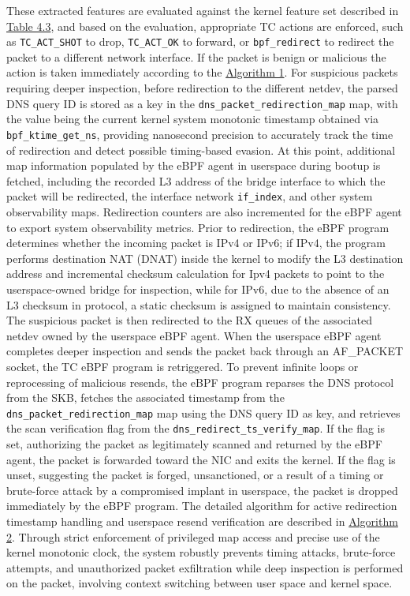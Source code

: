 \documentclass [11pt, proquest] {uwthesis}[2020/02/24]
\begin{document}
These extracted features are evaluated against the kernel feature set described in \hyperref[sec:feature-kernel]{Table 4.3}, and based on the evaluation, appropriate TC actions are enforced, such as \texttt{TC\_ACT\_SHOT} to drop, \texttt{TC\_ACT\_OK} to forward, or \texttt{bpf\_redirect} to redirect the packet to a different network interface. If the packet is benign or malicious the action is taken immediately according to the \hyperref[sec:alg1]{Algorithm 1}. For suspicious packets requiring deeper inspection, before redirection to the different netdev, the parsed DNS query ID is stored as a key in the \texttt{dns\_packet\_redirection\_map} map, with the value being the current kernel system monotonic timestamp obtained via \texttt{bpf\_ktime\_get\_ns}, providing nanosecond precision to accurately track the time of redirection and detect possible timing-based evasion. At this point, additional map information populated by the eBPF agent in userspace during bootup is fetched, including the recorded L3 address of the bridge interface to which the packet will be redirected, the interface network \texttt{if\_index}, and other system observability maps. Redirection counters are also incremented for the eBPF agent to export system observability metrics. Prior to redirection, the eBPF program determines whether the incoming packet is IPv4 or IPv6; if IPv4, the program performs destination NAT (DNAT) inside the kernel to modify the L3 destination address and incremental checksum calculation for Ipv4 packets to point to the userspace-owned bridge for inspection, while for IPv6, due to the absence of an L3 checksum in protocol, a static checksum is assigned to maintain consistency. The suspicious packet is then redirected to the RX queues of the associated netdev owned by the userspace eBPF agent. When the userspace eBPF agent completes deeper inspection and sends the packet back through an AF\_PACKET socket, the TC eBPF program is retriggered. To prevent infinite loops or reprocessing of malicious resends, the eBPF program reparses the DNS protocol from the SKB, fetches the associated timestamp from the \texttt{dns\_packet\_redirection\_map} map using the DNS query ID as key, and retrieves the scan verification flag from the \texttt{dns\_redirect\_ts\_verify\_map}. If the flag is set, authorizing the packet as legitimately scanned and returned by the eBPF agent, the packet is forwarded toward the NIC and exits the kernel. If the flag is unset, suggesting the packet is forged, unsanctioned, or a result of a timing or brute-force attack by a compromised implant in userspace, the packet is dropped immediately by the eBPF program. The detailed algorithm for active redirection timestamp handling and userspace resend verification are described in \hyperref[sec:alg2]{Algorithm 2}. Through strict enforcement of privileged map access and precise use of the kernel monotonic clock, the system robustly prevents timing attacks, brute-force attempts, and unauthorized packet exfiltration while deep inspection is performed on the packet, involving context switching between user space and kernel space.
\end{document}
